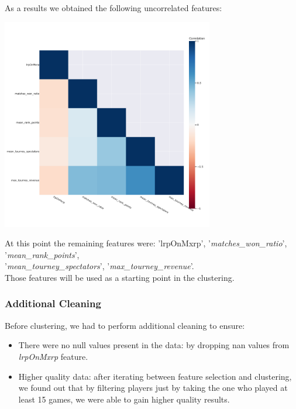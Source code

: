 As a results we obtained the following uncorrelated features:
\begin{center}
    \includegraphics[width=350px]{plots/correlation_plot}
    \label{fig:correlation_plot}
    \label{fig1}
\end{center}
At this point the remaining features were: 'lrpOnMxrp', '\textit{matches\_won\_ratio}', '\textit{mean\_rank\_points}',\\ '\textit{mean\_tourney\_spectators}', '\textit{max\_tourney\_revenue}'.\\
Those features will be used as a starting point in the clustering.

\subsubsection{Additional Cleaning}
Before clustering, we had to perform additional cleaning to ensure:
\begin{itemize}
    \item There were no null values present in the data: by dropping nan values from \textit{lrpOnMxrp} feature.
    \item Higher quality data: after iterating between feature selection and clustering, we found out that by filtering players just by taking the one who played at least 15 games, we were able to gain higher quality results.
\end{itemize}
